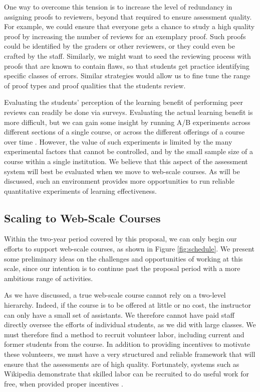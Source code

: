 \documentclass[12pt]{article}
\begin{document}
One way to overcome this tension is to increase the level of
redundancy in assigning proofs to reviewers, beyond that required to
ensure assessment quality.  For example, we could ensure that everyone
gets a chance to study a high quality proof by increasing the number
of reviews for an exemplary proof.  Such proofs could be identified by
the graders or other reviewers, or they could even be crafted by the
staff.  Similarly, we might want to seed the reviewing process with
proofs that are known to contain flaws, so that students get
practice identifying specific classes of errors.  Similar strategies
would allow us to fine tune the range of proof types and proof
qualities that the students review.

Evaluating the students' perception of the learning benefit of
performing peer reviews can readily be done via surveys.  Evaluating
the actual learning benefit is more difficult, but we can gain some
insight by running A/B experiments across different sections of a
single course, or across the different offerings of a course over time
\citep{kohavi-dmkd09}.  However, the value of such experiments is
limited by the many experimental factors that cannot be controlled,
and by the small sample size of a course within a single institution.
We believe that this aspect of the assessment system will best be
evaluated when we move to web-scale courses.  As will be discussed,
such an environment provides more opportunities to run reliable
quantitative experiments of learning effectiveness.

\subsection{Scaling to Web-Scale Courses}

Within the two-year period covered by this proposal, we can only
begin our efforts to support web-scale courses, as shown in Figure
\ref{fig:schedule}.  We present some preliminary ideas on the
challenges and opportunities of working at this scale, since our
intention is to continue past the proposal period with a more
ambitious range of activities.

As we have discussed, a true web-scale course cannot rely on a
two-level hierarchy.  Indeed, if the course is to be offered at little
or no cost, the instructor can only have a small set of assistants.
We therefore cannot have paid staff directly oversee the efforts of
individual students, as we did with large classes.  We must therefore
find a method to recruit volunteer labor, including current and former
students from the course.  In addition to providing incentives to
motivate these volunteers, we must have a very structured and reliable
framework that will ensure that the assessments are of high quality.
Fortunately, systems such as Wikipedia demonstrate that skilled labor
can be recruited to do useful work for free, when provided proper incentives
\citep{nov-cacm07}.
\end{document}
